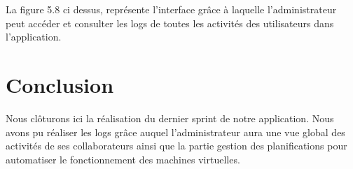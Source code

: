 La figure 5.8 ci dessus, représente l'interface grâce à laquelle l'administrateur peut accéder et consulter les logs de toutes les activités des utilisateurs dans l'application.
\section{Conclusion}
Nous clôturons ici la réalisation du dernier sprint de notre application. Nous avons pu réaliser les logs grâce
auquel l'administrateur aura une vue global des activités de ses collaborateurs ainsi que
la partie gestion des planifications pour automatiser le fonctionnement des machines virtuelles.